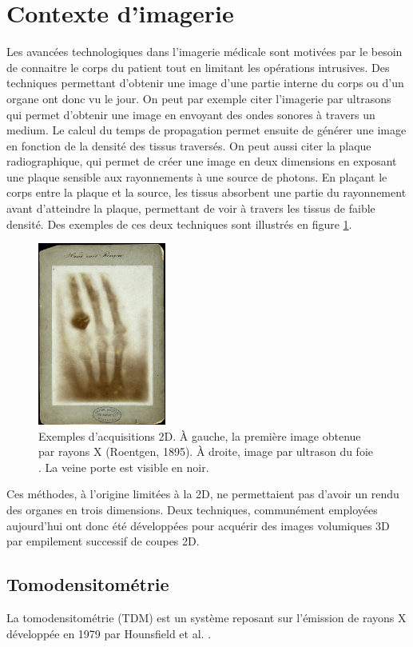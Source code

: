 \section{Contexte d'imagerie}
\label{sec:contexte:images}
Les avancées technologiques dans l'imagerie médicale sont motivées par le besoin de connaitre le corps du patient tout en limitant les opérations intrusives. Des techniques permettant d'obtenir une image d'une partie interne du corps ou d'un organe ont donc vu le jour. On peut par exemple citer l'imagerie par ultrasons qui permet d'obtenir une image en envoyant des ondes sonores à travers un medium. Le calcul du temps de propagation permet ensuite de générer une image en fonction de la densité des tissus traversés. On peut aussi citer la plaque radiographique, qui permet de créer une image en deux dimensions en exposant une plaque sensible aux rayonnements à une source de photons. En plaçant le corps entre la plaque et la source, les tissus absorbent une partie du rayonnement avant d'atteindre la plaque, permettant de voir à travers les tissus de faible densité. Des exemples de ces deux techniques sont illustrés en figure \ref{fig:2D imaging}.
\begin{figure}
    \centering
    \includegraphics[height=6cm]{Images/first_CT.png}
    \caption{Exemples d'acquisitions 2D. À gauche, la première image obtenue par rayons X (Roentgen, 1895). À droite, image par ultrason du foie \protect\footnotemark. La veine porte est visible en noir.}
    \label{fig:2D imaging}
\end{figure}
Ces méthodes, à l'origine limitées à la 2D, ne permettaient pas d'avoir un rendu des organes en trois dimensions. Deux techniques, communément employées aujourd'hui ont donc été développées pour acquérir des images volumiques 3D par empilement successif de coupes 2D.
\subsection{Tomodensitométrie}
\label{sec:contexte:images:CT}
La tomodensitométrie (TDM) est un système reposant sur l'émission de rayons X développée en 1979 par Hounsfield et al. \cite{Hounsfield1995_CT_machine}.

